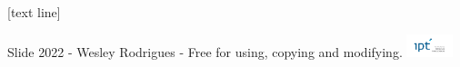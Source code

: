 [text line]{
    \parbox{0.90\linewidth}{
        \vspace*{-8em}
        Slide \insertpagenumber
        \hfill
        2022 - Wesley Rodrigues -
        Free for using, copying and modifying.
        \hfill
        \includegraphics[width=0.10\textwidth]{logos/logo_ipt_light_700_350.png}
    }}



